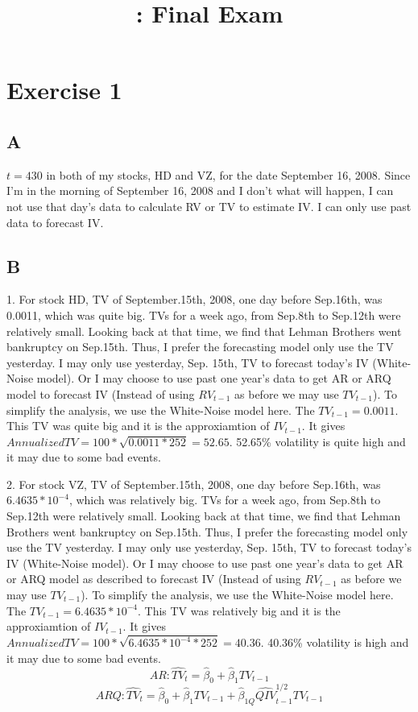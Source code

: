 \documentclass{report}
\title{\LectureTitle: Final Exam}
\begin{document}
\maketitle
\newpage

\section{Exercise 1}

\subsection{A}

$ t = 430$ in both of my stocks, HD and VZ, for the date September 16, 2008. Since I'm in the morning of September 16, 2008 and I don't what will happen, I can not use that day's data to calculate RV or TV to estimate IV. I can only use past data to forecast IV.

\subsection{B}

1. For stock HD, TV of September.15th, 2008, one day before Sep.16th, was 0.0011, which was quite big. TVs for a week ago, from Sep.8th to Sep.12th were relatively small. Looking back at that time, we find that Lehman Brothers went bankruptcy on Sep.15th. Thus, I prefer the forecasting model only use the TV yesterday. I  may only use yesterday, Sep. 15th, TV to forecast today's IV (White-Noise model). Or I may choose to use past one year's data to get AR or ARQ model to forecast IV (Instead of using $RV_{t-1}$ as before we may use $TV_{t-1}$). To simplify the analysis, we use the White-Noise model here. The $TV_{t-1} = 0.0011$. This TV was quite big and it is the approxiamtion of $IV_{t-1}$. It gives $ Annualized TV = 100 * \sqrt{0.0011*252} = 52.65 $. 52.65\% volatility is quite high and it may due to some bad events.


2. For stock VZ, TV of September.15th, 2008, one day before Sep.16th, was $6.4635*10^{-4}$, which was relatively big. TVs for a week ago, from Sep.8th to Sep.12th were relatively small. Looking back at that time, we find that Lehman Brothers went bankruptcy on Sep.15th. Thus, I prefer the forecasting model only use the TV yesterday. I  may only use yesterday, Sep. 15th, TV to forecast today's IV (White-Noise model). Or I may choose to use past one year's data to get AR or ARQ model as described to forecast IV (Instead of using $RV_{t-1}$ as before we may use $TV_{t-1}$). To simplify the analysis, we use the White-Noise model here. The $TV_{t-1} = 6.4635*10^{-4}$. This TV was relatively big and it is the approxiamtion of $IV_{t-1}$. It gives $ Annualized TV = 100 * \sqrt{6.4635*10^{-4}*252} = 40.36 $. 40.36\% volatility is high and it may due to some bad events.
\[ AR : \hat{TV}_{t} = \hat{\beta}_{0} + \hat{\beta}_{1}TV_{t-1} \]
\[ ARQ : \hat{TV}_{t} = \hat{\beta}_{0} + \hat{\beta}_{1}TV_{t-1} + \hat{\beta}_{1Q}\hat{QIV}^{1/2}_{t-1}TV_{t-1} \]
\end{document}
